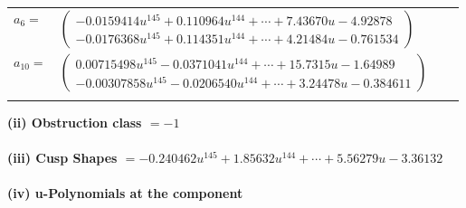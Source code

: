 \documentclass[1p]{elsarticle_modified}
\theoremstyle{definition}
\begin{document}
\begin{tabular}{m{7pt} m{180pt} m{7pt} m{180pt} }
\flushright $a_{6}=$&$\begin{pmatrix}-0.0159414 u^{145}+0.110964 u^{144}+\cdots+7.43670 u-4.92878\\-0.0176368 u^{145}+0.114351 u^{144}+\cdots+4.21484 u-0.761534\end{pmatrix}$ \\
\flushright $a_{10}=$&$\begin{pmatrix}0.00715498 u^{145}-0.0371041 u^{144}+\cdots+15.7315 u-1.64989\\-0.00307858 u^{145}-0.0206540 u^{144}+\cdots+3.24478 u-0.384611\end{pmatrix}$\\&\end{tabular}
\flushleft \textbf{(ii) Obstruction class $= -1$}\\~\\
\flushleft \textbf{(iii) Cusp Shapes $= -0.240462 u^{145}+1.85632 u^{144}+\cdots+5.56279 u-3.36132$}\\~\\
\newpage\renewcommand{\arraystretch}{1}
\flushleft \textbf{(iv) u-Polynomials at the component}\newline \\
\end{document}
